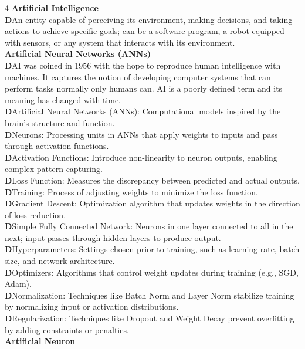 \documentclass[8pt]{extarticle}
\newcommand{\dtag}{\textcolor{definitioncolor}{\tiny\textbf{D}}\;}
\begin{document}
\begin{multicols}{4}
\vspace{2pt}\textbf{Artificial Intelligence}\\
\dtag An entity capable of perceiving its environment, making decisions, and taking actions to achieve specific goals; can be a software program, a robot equipped with sensors, or any system that interacts with its environment.\\
\vspace{2pt}\textbf{Artificial Neural Networks (ANNs)}\\
\dtag AI was coined in 1956 with the hope to reproduce human intelligence with machines. It captures the notion of developing computer systems that can perform tasks normally only humans can. AI is a poorly defined term and its meaning has changed with time.\\
\dtag Artificial Neural Networks (ANNs): Computational models inspired by the brain's structure and function.\\
\dtag Neurons: Processing units in ANNs that apply weights to inputs and pass through activation functions.\\
\dtag Activation Functions: Introduce non-linearity to neuron outputs, enabling complex pattern capturing.\\
\dtag Loss Function: Measures the discrepancy between predicted and actual outputs.\\
\dtag Training: Process of adjusting weights to minimize the loss function.\\
\dtag Gradient Descent: Optimization algorithm that updates weights in the direction of loss reduction.\\
\dtag Simple Fully Connected Network: Neurons in one layer connected to all in the next; input passes through hidden layers to produce output.\\
\dtag Hyperparameters: Settings chosen prior to training, such as learning rate, batch size, and network architecture.\\
\dtag Optimizers: Algorithms that control weight updates during training (e.g., SGD, Adam).\\
\dtag Normalization: Techniques like Batch Norm and Layer Norm stabilize training by normalizing input or activation distributions.\\
\dtag Regularization: Techniques like Dropout and Weight Decay prevent overfitting by adding constraints or penalties.\\
\vspace{2pt}\textbf{Artificial Neuron}\\

\end{multicols}
\end{document}
